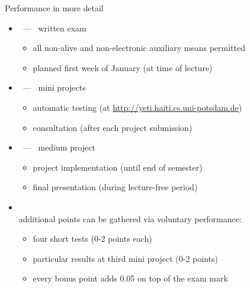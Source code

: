 \begin{frame}[c]{Performance in more detail}
  \begin{itemize}
  \item<1->  \ --- \ \alert{written exam}
    \begin{itemize}
    \item all non-alive and non-electronic auxiliary means permitted
    \item planned first week of January (at time of lecture) %
    \end{itemize}
    \medskip
  \item<1->  \ --- \ \alert{mini projects}
    \begin{itemize}
    \item automatic testing (at \url{http://yeti.haiti.cs.uni-potsdam.de})
    \item consultation (after each project submission)
    \end{itemize}
    \medskip
  \item<2->  \ --- \ \alert{medium project}
    \begin{itemize}
    \item project implementation  (until end of semester)
    \item final presentation (during lecture-free period)
    \end{itemize}
    \medskip
  \item<3-> \\
    additional points can be gathered via voluntary performance:
    \begin{itemize}
    \item four short tests  (0-2 points each)
    \item particular results at third mini project (0-2 points)
    \item every bonus point adds 0.05 on top of the exam mark
    \end{itemize}
  \end{itemize}
\end{frame}
